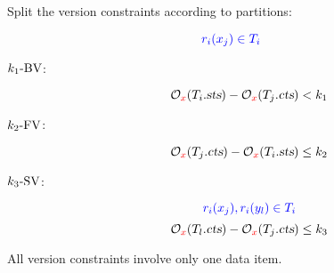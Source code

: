 \begin{frame}{}
  Split the \rvsi{} version constraints according to partitions:

  \[
    \textcolor{blue}{r_i(x_j) \in T_i}
  \]
  \vspace{-0.40cm}
  \begin{description}
    \item[$k_1\text{-BV}$:]
      \[
	\mathcal{O}_{\textcolor{red}{x}}(T_i.\textsl{sts}) - \mathcal{O}_{\textcolor{red}{x}}(T_j.\textsl{cts}) < k_1
      \]
    \item[$k_2\text{-FV}$:]
      \[
	\mathcal{O}_{\textcolor{red}{x}}(T_j.\textsl{cts}) - \mathcal{O}_{\textcolor{red}{x}}(T_i.\textsl{sts}) \le k_2
      \]
    \item[$k_3\text{-SV}$:]
      \[
	\textcolor{blue}{r_i(x_j), r_i(y_l) \in T_i}
      \]
      \vspace{-0.40cm}
      \[
	\mathcal{O}_{\textcolor{red}{x}}(T_l.\textsl{cts}) - \mathcal{O}_{\textcolor{red}{x}}(T_j.\textsl{cts}) \le k_3
      \]
  \end{description}

  \vspace{0.6cm}
  \centerline{All version constraints involve only one data item.}
\end{frame}

\begin{frame}{}
  \begin{center}
    \begin{minipage}{1.0\textwidth}
      
    \end{minipage}
  \end{center}
\end{frame}

\begin{frame}{}
  \begin{center}
    \begin{minipage}{1.0\textwidth}
      
    \end{minipage}
  \end{center}
\end{frame}

\begin{frame}{}
  \begin{center}
  \end{center}
\end{frame}

\begin{frame}{}
  \begin{center}
    \begin{minipage}{1.0\textwidth}
      
    \end{minipage}
  \end{center}
\end{frame}
